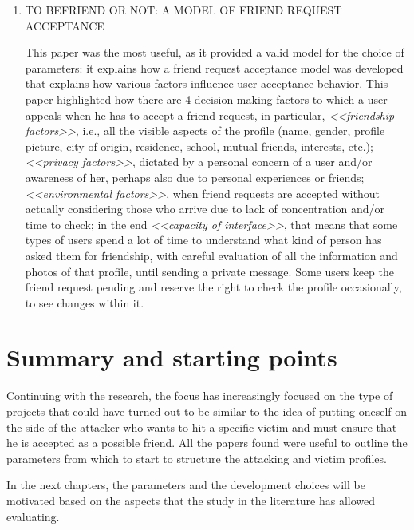 \begin{enumerate}
	\item 
	\textsc{TO BEFRIEND OR NOT: A MODEL OF FRIEND REQUEST ACCEPTANCE} \parencite{site:paper7}
	\label{cap:to-be-friend}
	\par This paper was the most useful, as it provided a valid model for the choice of parameters: it explains how a friend request acceptance model was developed that explains how various factors influence user acceptance behavior. This paper highlighted how there are 4 decision-making factors to which a user appeals when he has to accept a friend request, in particular, \textit{<<friendship factors>>}, i.e., all the visible aspects of the profile (name, gender, profile picture, city of origin, residence, school, mutual friends, interests, etc.); \textit{<<privacy factors>>}, dictated by a personal concern of a user and/or awareness of her, perhaps also due to personal experiences or friends; \textit{<<environmental factors>>}, when friend requests are accepted without actually considering those who arrive due to lack of concentration and/or time to check; in the end \textit{<<capacity of interface>>}, that means that some types of users spend a lot of time to understand what kind of person has asked them for friendship, with careful evaluation of all the information and photos of that profile, until sending a private message. Some users keep the friend request pending and reserve the right to check the profile occasionally, to see changes within it.
\end{enumerate}

\section{Summary and starting points}
Continuing with the research, the focus has increasingly focused on the type of projects that could have turned out to be similar to the idea of putting oneself on the side of the attacker who wants to hit a specific victim and must ensure that he is accepted as a possible friend. All the papers found were useful to outline the parameters from which to start to structure the attacking and victim profiles.
\par \noindent In the next chapters, the parameters and the development choices will be motivated based on the aspects that the study in the literature has allowed evaluating.